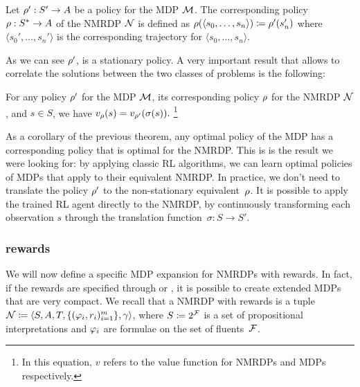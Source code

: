 \begin{definition}
	\cite{bib:nmrdp-logic-first} Let $\rho': S' \to A$ be a policy for the
	MDP $\mathcal{M}$. The corresponding policy $\rho: S^* \to A$ of the NMRDP
	$\mathcal{N}$ is defined as $\rho(\langle s_0, \dots, s_n \rangle) \coloneqq
	\rho'(s_n')$ where $\langle s_0', \dots, s_n' \rangle$ is the
	corresponding trajectory for $\langle s_0, \dots, s_n \rangle$.
\end{definition}
As we can see $\rho'$, is a stationary policy. A very important result that
allows to correlate the solutions between the two classes of problems is the
following:
\begin{theorem}
	\cite{bib:nmrdp-logic-first} For any policy $\rho'$ for the MDP $\mathcal{M}$,
	its corresponding policy $\rho$ for the NMRDP $\mathcal{N}$, and $s \in S$,
	we have $v_\rho(s) = v_{\rho'}(\sigma(s)).~$\footnote{In this equation,
	$v$ refers to the value function for NMRDPs and MDPs respectively.}
\end{theorem}
As a corollary of the previous theorem, any optimal policy of the MDP has a
corresponding policy that is optimal for the NMRDP. This is is the result we
were looking for: by applying classic RL algorithms, we can learn optimal
policies of MDPs that apply to their equivalent NMRDP. In practice, we don't
need to translate the policy $\rho'$ to the non-stationary
equivalent~$\rho$.  It is possible to apply the trained RL agent directly
to the NMRDP, by continuously transforming each observation $s$ through the
translation function~$\sigma: S \to S'$.


\subsubsection*{\ldl{} rewards}

We will now define a specific MDP expansion for NMRDPs with \ldl{} rewards.
In fact, if the rewards are specified through \ldl{} or \ltl{}, it is possible
to create extended MDPs that are very compact. We recall that a NMRDP with
\ldl{} rewards is a tuple $\mathcal{N} \coloneqq {\langle S, A, T,
\{(\varphi_i, r_i)_{i=1}^m\}, \gamma\rangle}$, where $S \coloneqq
2^{\mathcal{F}}$ is a set of propositional interpretations and $\varphi_i$ are
\ldl{} formulae on the set of fluents~$\mathcal{F}$.

